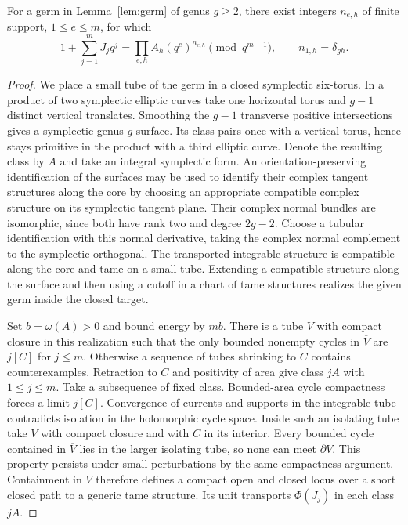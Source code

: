 \begin{proposition}\label{prop:tube}
For a germ in Lemma~\ref{lem:germ} of genus $g\ge2$, there exist integers
$n_{e,h}$ of finite support, $1\le e\le m$, for which
\begin{equation}\label{eq:tube}
 1+\sum_{j=1}^m J_jq^j =
 \prod_{e,h} A_h(q^e)^{n_{e,h}}\pmod {q^{m+1}},
 \qquad n_{1,h}=\delta_{gh}.
\end{equation}
\end{proposition}
\begin{proof}
We place a small tube of the germ in a closed symplectic six-torus.
In a product of two symplectic elliptic curves take one horizontal torus
and $g-1$ distinct vertical translates. Smoothing the $g-1$ transverse
positive intersections gives a symplectic genus-$g$ surface. Its class
pairs once with a vertical torus, hence stays primitive in the product
with a third elliptic curve. Denote the resulting class by $A$ and take
an integral symplectic form. An orientation-preserving identification
of the surfaces may be used to identify their complex tangent structures
along the core by choosing an appropriate compatible complex structure
on its symplectic tangent plane. Their complex normal bundles are
isomorphic, since both have rank two and degree $2g-2$. Choose a tubular
identification with this normal derivative, taking the complex normal
complement to the symplectic orthogonal. The transported integrable
structure is compatible along the core and tame on a small tube.
Extending a compatible structure along the surface and then using a
cutoff in a chart of tame structures realizes the given germ inside
the closed target.

Set $b=\omega(A)>0$ and bound energy by $mb$. There is a tube $V$
with compact closure in this realization such that the only bounded
nonempty cycles in $\overline V$ are $j[C]$ for $j\le m$. Otherwise
a sequence of tubes shrinking to $C$ contains counterexamples. Retraction
to $C$ and positivity of area give class $jA$ with $1\le j\le m$.
Take a subsequence of fixed class. Bounded-area cycle compactness
\cite[Theorem~2.11]{DIW} forces a limit $j[C]$. Convergence of currents
and supports in the integrable tube contradicts isolation in the
holomorphic cycle space. Inside such an isolating tube take $V$ with
compact closure and with $C$ in its interior. Every bounded cycle
contained in $\overline V$ lies in the larger isolating tube, so none
can meet $\partial V$. This property persists under small
perturbations by the same compactness argument. Containment in $V$
therefore defines a compact open and closed locus over a short closed
path to a generic tame structure. Its unit transports $\Phi(J_j)$
in each class $jA$.


\end{proof}
